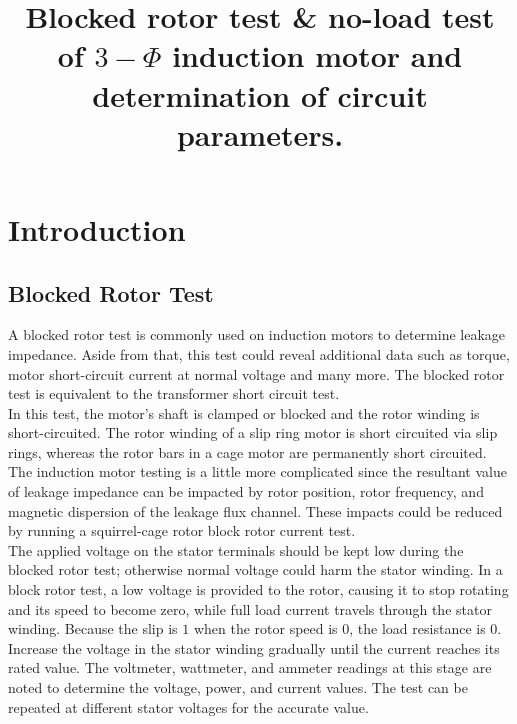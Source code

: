 \documentclass[12pt]{article}
\title{Blocked rotor test \& no-load test of \(3-\Phi\) induction motor and determination of circuit parameters.}
\author{}
\date{}
\begin{document}

\pagebreak

\maketitle
\section{Introduction}
\subsection*{Blocked Rotor Test}
A blocked rotor test is commonly used on induction motors to determine leakage impedance. Aside from that, this test could reveal additional data such as torque, motor short-circuit current at normal voltage and many more. The blocked rotor test is equivalent to the transformer short circuit test.\\
In this test, the motor's shaft is clamped or blocked and the rotor winding is short-circuited. The rotor winding of a slip ring motor is short circuited via slip rings, whereas the rotor bars in a cage motor are permanently short circuited. The induction motor testing is a little more complicated since the resultant value of leakage impedance can be impacted by rotor position, rotor frequency, and magnetic dispersion of the leakage flux channel. These impacts could be reduced by running a squirrel-cage rotor block rotor current test.\\
The applied voltage on the stator terminals should be kept low during the blocked rotor test; otherwise normal voltage could harm the stator winding. In a block rotor test, a low voltage is provided to the rotor, causing it to stop rotating and its speed to become zero, while full load current travels through the stator winding. Because the slip is $1$ when the rotor speed is $0$, the load resistance is $0$. Increase the voltage in the stator winding gradually until the current reaches its rated value. The voltmeter, wattmeter, and ammeter readings at this stage are noted to determine the voltage, power, and current values. The test can be repeated at different stator voltages for the accurate value.\cite{blocked}
\end{document}
